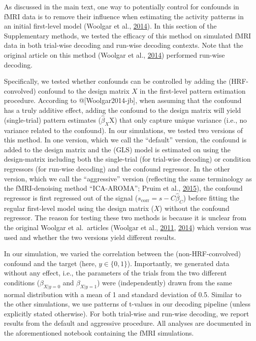 \documentclass[11pt,american,]{memoir} %
\begin{document}
As discussed in the main text, one way to potentially control for confounds in fMRI data is to remove their influence when estimating the activity patterns in an initial first-level model (Woolgar et al., \protect\hyperlink{ref-Woolgar2014-jb}{2014}). In this section of the Supplementary methods, we tested the efficacy of this method on simulated fMRI data in both trial-wise decoding and run-wise decoding contexts. Note that the original article on this method (Woolgar et al., \protect\hyperlink{ref-Woolgar2014-jb}{2014}) performed run-wise decoding.

Specifically, we tested whether confounds can be controlled by adding the (HRF-convolved) confound to the design matrix \(X\) in the first-level pattern estimation procedure. According to @{[}Woolgar2014-jb{]}, when assuming that the confound has a truly additive effect, adding the confound to the design matrix will yield (single-trial) pattern estimates (\(\hat{\beta}_{X}\)X) that only capture unique variance (i.e., no variance related to the confound). In our simulations, we tested two versions of this method. In one version, which we call the ``default'' version, the confound is added to the design matrix and the (GLS) model is estimated on using the design-matrix including both the single-trial (for trial-wise decoding) or condition regressors (for run-wise decoding) and the confound regressor. In the other version, which we call the ``aggressive'' version (reflecting the same terminology as the fMRI-denoising method ``ICA-AROMA''; Pruim et al., \protect\hyperlink{ref-pruim2015ica}{2015}), the confound regressor is first regressed out of the signal (\(s_{\mathrm{corr}} = s- C\hat{\beta}_{C}\)) before fitting the regular first-level model using the design matrix (\(X\)) without the confound regressor. The reason for testing these two methods is because it is unclear from the original Woolgar et al.~articles (Woolgar et al., \protect\hyperlink{ref-woolgar2011multi}{2011}, \protect\hyperlink{ref-Woolgar2014-jb}{2014}) which version was used and whether the two versions yield different results.

In our simulation, we varied the correlation between the (non-HRF-convolved) confound and the target (here, \(y \in \{0,1\}\)). Importantly, we generated data without any effect, i.e., the parameters of the trials from the two different conditions (\(\beta_{X | y = 0}\) and \(\beta_{X | y = 1}\)) were (independently) drawn from the same normal distribution with a mean of 1 and standard deviation of 0.5. Similar to the other simulations, we use patterns of t-values in our decoding pipeline (unless explicitly stated otherwise). For both trial-wise and run-wise decoding, we report results from the default and aggressive procedure. All analyses are documented in the aforementioned notebook containing the fMRI simulations.
\end{document}
